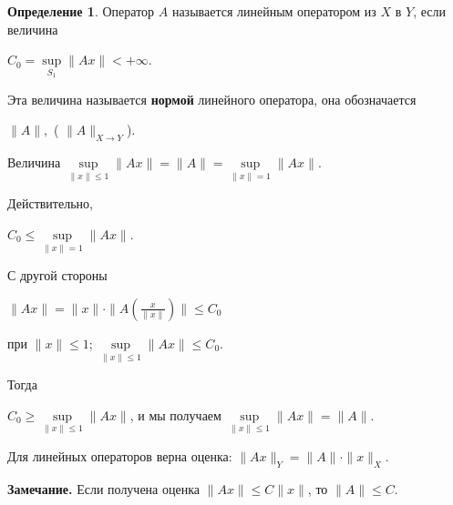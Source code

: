 \documentclass[12pt,a4paper,titlepage,oneside]{book}
\theoremstyle{definition}
\newtheorem*{definition}{Определение}
\theoremstyle{plain}
\theoremstyle{remark}
\theoremstyle{remark}
\theoremstyle{remark}
\theoremstyle{remark}
\theoremstyle{plain}
\theoremstyle{plain}
\begin{document}
\begin{definition} Оператор $A$ называется линейным оператором из $X$ в $Y$, если величина 
\begin{center}
$ C_0=\underset{S_1}{\sup}\parallel Ax \parallel<+\infty $.
\end{center}
\end{definition}

Эта величина называется \textbf{нормой} линейного оператора, она обозначается
\begin{center}
$\parallel A \parallel,$ \quad
( $\parallel A \parallel _{X \to Y}$).
\end{center}

Величина $\underset{\parallel x\parallel \leq1}{\sup}\parallel Ax \parallel =
\parallel A \parallel =
\underset{\parallel x\parallel=1}{\sup}\parallel Ax \parallel$.

Действительно,
\begin{center}
$C_0\leq 
\underset{\parallel x\parallel=1}{\sup}\parallel Ax \parallel$.
\end{center}

С другой стороны 
\begin{center}
$\parallel Ax \parallel=
\parallel x \parallel \cdot \parallel A(\frac{x}{\parallel x \parallel}) \parallel \leq C_0$
\end{center} 
при $\parallel x \parallel \leq 1$; 
$\underset{\parallel x\parallel \leq 1}{\sup}\parallel Ax \parallel \leq C_0$.

Тогда 
\begin{center}
$ C_0 \geq\underset{\parallel x\parallel \leq 1}{\sup}\parallel Ax \parallel $, и мы получаем 
$\underset{\parallel x\parallel \leq 1}{\sup}\parallel Ax \parallel =\parallel A \parallel$.
\end{center}

Для линейных операторов верна оценка: $\parallel Ax \parallel _{Y} =\parallel A \parallel \cdot \parallel x \parallel_{X} $.

\textbf{Замечание.} Если получена оценка  $\parallel Ax \parallel \leq {C}  \parallel x \parallel$, то $\parallel A \parallel \leq {C} $.
\end{document}
